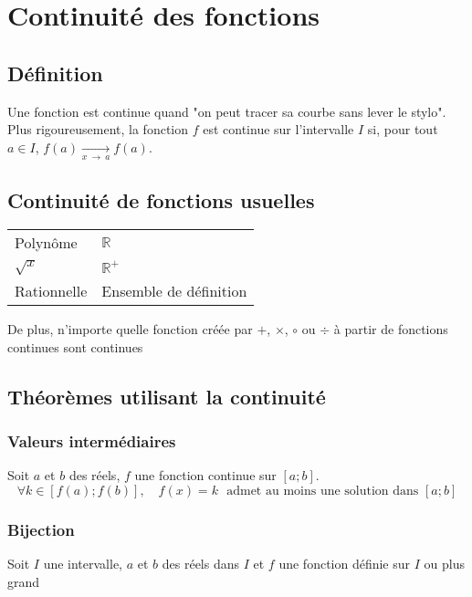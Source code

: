 \documentclass{article}
\newcommand{\R}{\mathds{R}}
\newcommand{\goesto}[2]{\xrightarrow[#1\:\to\:#2]{}}
\begin{document}
\section{Continuité des fonctions}

\subsection{Définition}

Une fonction est continue quand "on peut tracer sa courbe sans lever le stylo". Plus rigoureusement, la fonction $f$ est continue sur l'intervalle $I$ si, pour tout $a \in I$, $f(a) \goesto{x}{a} f(a)$.

\subsection{Continuité de fonctions usuelles}

\begin{table}[H]
    \centering
    \begin{tabular}{ll}
         Polynôme & $\R$ \\
         $\sqrt{x}$ & $\R^+$ \\
         Rationnelle & Ensemble de définition \\
    \end{tabular}
\end{table}

De plus, n'importe quelle fonction créée par $+$, $\times$, $\circ$ ou $\div$ à partir de fonctions continues sont continues

\subsection{Théorèmes utilisant la continuité}
\subsubsection{Valeurs intermédiaires}

Soit $a$ et $b$ des réels, $f$ une fonction continue sur $[a; b]$.
\[\forall k \in [f(a); f(b)],\quad f(x) = k\:\:\:\text{admet au moins une solution dans $[a;b]$}\]

\subsubsection{Bijection}

Soit $I$ une intervalle, $a$ et $b$ des réels dans $I$ et $f$ une fonction définie sur $I$ ou plus grand
\end{document}

